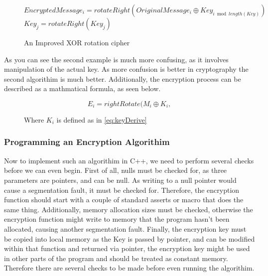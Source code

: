 \documentclass[12pt]{article}
\begin{document}
    \begin{figure}[h]
    \begin{algorithmic}[1]
      \State $EncryptedMessage_i =
             rotateRight(OriginalMessage_i \oplus Key_{i \bmod length(Key)})$
          \State $Key_j = rotateRight(Key_j)$
        \EndFor
      \EndIf
    \EndFor
    \end{algorithmic}
    \caption{An Improved XOR rotation cipher}
    \end{figure}
    
    As you can see the second example is much more confusing, as it involves
    manipulation of the actual key. As more confusion is better in 
    cryptography the second algorithim is much better. 
    Additionally, the encryption process can be described as a mathmatical
    formula, as seen below.
    
    \begin{figure}[h]
    \begin{equation}
      \label{eq:Encrypt}
      E_{i} = rightRotate(M_{i} \oplus K_{i},   
    \end{equation}
    \caption{Where \( K_i \) is defined as in \eqref{eq:keyDerive}}
    \end{figure}

    \subsubsection{Programming an Encryption Algorithim}
    Now to implement such an algorithim in C++, we need to perform several
    checks before we can even begin. First of all, nulls must be
    checked for, as three parameters are pointers, and can be null. As writing
    to a null pointer would cause a segmentation fault, it must be checked for.
    Therefore, the encryption function should start with a couple of standard
    asserts or macro that does the same thing. Additionally, memory allocation
    sizes must be checked, otherwise the encryption function might write to
    memory that the program hasn't  been allocated, causing another
    segmentation fault. Finally, the encryption key must be copied into
    local memory as the Key is passed by pointer, and can be modified within
    that function and returned via pointer, the encryption key might be used
    in other parts of the program and should be treated as constant memory.
    Therefore there are several checks to be made before even running the
    algorithim.
    
\end{document}
